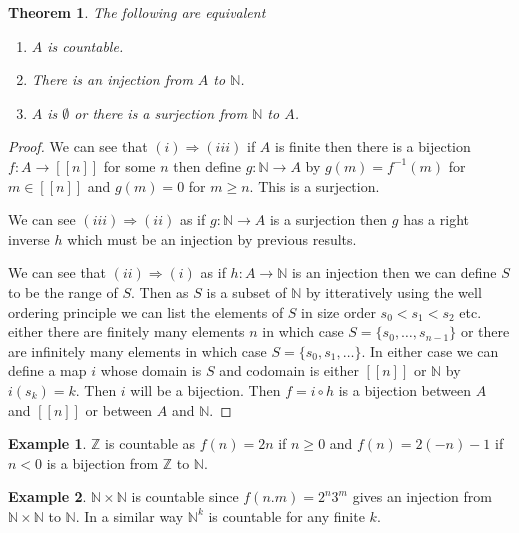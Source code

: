 \documentclass[
]{book}
\newtheorem{theorem}{Theorem}[chapter]
\theoremstyle{definition}
\theoremstyle{definition}
\newtheorem{example}{Example}[chapter]
\theoremstyle{definition}
\theoremstyle{definition}
\theoremstyle{remark}
\begin{document}
\begin{theorem}

The following are equivalent

\begin{enumerate}
\def\labelenumi{(\roman{enumi})}
\item
  \(A\) is countable.
\item
  There is an injection from \(A\) to \(\mathbb{N}\).
\item
  \(A\) is \(\emptyset\) or there is a surjection from \(\mathbb{N}\) to \(A\).
\end{enumerate}

\end{theorem}

\begin{proof}
We can see that \((i) \Rightarrow (iii)\) if \(A\) is finite then there is a bijection \(f: A \rightarrow [[n]]\) for some \(n\) then define \(g: \mathbb{N} \rightarrow A\) by \(g(m) = f^{-1}(m)\) for \(m \in [[n]]\) and \(g(m) = 0\) for \(m \geq n\). This is a surjection.

We can see \((iii) \Rightarrow (ii)\) as if \(g: \mathbb{N} \rightarrow A\) is a surjection then \(g\) has a right inverse \(h\) which must be an injection by previous results.

We can see that \((ii) \Rightarrow (i)\) as if \(h: A \rightarrow \mathbb{N}\) is an injection then we can define \(S\) to be the range of \(S\). Then as \(S\) is a subset of \(\mathbb{N}\) by itteratively using the well ordering principle we can list the elements of \(S\) in size order \(s_0 < s_1 < s_2\) etc. either there are finitely many elements \(n\) in which case \(S = \{s_0 , \dots, s_{n-1}\}\) or there are infinitely many elements in which case \(S = \{s_0, s_1, \dots\}\). In either case we can define a map \(i\) whose domain is \(S\) and codomain is either \([[n]]\) or \(\mathbb{N}\) by \(i(s_k)=k\). Then \(i\) will be a bijection. Then \(f = i \circ h\) is a bijection between \(A\) and \([[n]]\) or between \(A\) and \(\mathbb{N}\).
\end{proof}

\begin{example}
\(\mathbb{Z}\) is countable as \(f(n) = 2n\) if \(n \geq 0\) and \(f(n) = 2(-n)-1\) if \(n < 0\) is a bijection from \(\mathbb{Z}\) to \(\mathbb{N}\).
\end{example}

\begin{example}
\(\mathbb{N} \times \mathbb{N}\) is countable since \(f(n.m) = 2^n 3^m\) gives an injection from \(\mathbb{N} \times \mathbb{N}\) to \(\mathbb{N}\). In a similar way \(\mathbb{N}^k\) is countable for any finite \(k\).
\end{example}
\end{document}
